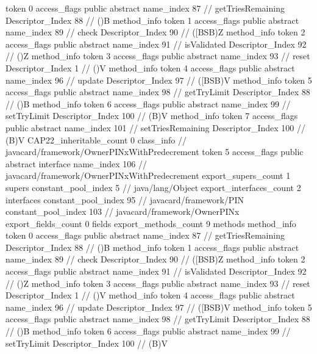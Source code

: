 {{{{{					token	0
					access_flags	public abstract
					name_index	87		// getTriesRemaining
					Descriptor_Index	88		// ()B
				}
				method_info {
					token	1
					access_flags	public abstract
					name_index	89		// check
					Descriptor_Index	90		// ([BSB)Z
				}
				method_info {
					token	2
					access_flags	public abstract
					name_index	91		// isValidated
					Descriptor_Index	92		// ()Z
				}
				method_info {
					token	3
					access_flags	public abstract
					name_index	93		// reset
					Descriptor_Index	1		// ()V
				}
				method_info {
					token	4
					access_flags	public abstract
					name_index	96		// update
					Descriptor_Index	97		// ([BSB)V
				}
				method_info {
					token	5
					access_flags	public abstract
					name_index	98		// getTryLimit
					Descriptor_Index	88		// ()B
				}
				method_info {
					token	6
					access_flags	public abstract
					name_index	99		// setTryLimit
					Descriptor_Index	100		// (B)V
				}
				method_info {
					token	7
					access_flags	public abstract
					name_index	101		// setTriesRemaining
					Descriptor_Index	100		// (B)V
				}
			}
			CAP22_inheritable_count	0
		}
		class_info {		// javacard/framework/OwnerPINxWithPredecrement
			token	5
			access_flags	public abstract interface
			name_index	106		// javacard/framework/OwnerPINxWithPredecrement
			export_supers_count	1
			supers {
				constant_pool_index	5		// java/lang/Object
			}
			export_interfaces_count	2
			interfaces {
				constant_pool_index	95		// javacard/framework/PIN
				constant_pool_index	103		// javacard/framework/OwnerPINx
			}
			export_fields_count	0
			fields {
			}
			export_methods_count	9
			methods {
				method_info {
					token	0
					access_flags	public abstract
					name_index	87		// getTriesRemaining
					Descriptor_Index	88		// ()B
				}
				method_info {
					token	1
					access_flags	public abstract
					name_index	89		// check
					Descriptor_Index	90		// ([BSB)Z
				}
				method_info {
					token	2
					access_flags	public abstract
					name_index	91		// isValidated
					Descriptor_Index	92		// ()Z
				}
				method_info {
					token	3
					access_flags	public abstract
					name_index	93		// reset
					Descriptor_Index	1		// ()V
				}
				method_info {
					token	4
					access_flags	public abstract
					name_index	96		// update
					Descriptor_Index	97		// ([BSB)V
				}
				method_info {
					token	5
					access_flags	public abstract
					name_index	98		// getTryLimit
					Descriptor_Index	88		// ()B
				}
				method_info {
					token	6
					access_flags	public abstract
					name_index	99		// setTryLimit
					Descriptor_Index	100		// (B)V
}}}}}
